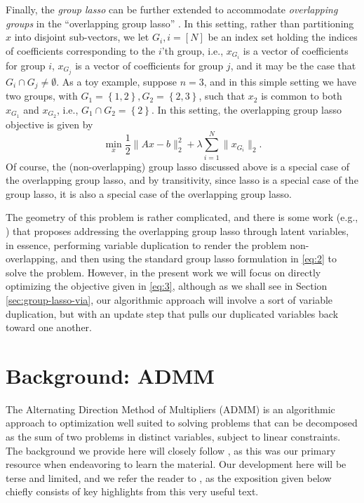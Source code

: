 \documentclass{article}
\begin{document}
Finally, the \emph{group lasso} can be further extended to accommodate \emph{overlapping groups} in the ``overlapping group lasso'' \cite{zhao_composite_2009,mairal_network_2010}.
In this setting, rather than partitioning $x$ into disjoint sub-vectors, we let $G_i, i = [N]$ be an index set holding the indices of coefficients corresponding to the $i$'th group, i.e., $x_{G_i}$ is a vector of coefficients for group $i$, $x_{G_j}$ is a vector of coefficients for group $j$, and it may be the case that $G_i \cap G_j \neq \emptyset$.
As a toy example, suppose $n=3$, and in this simple setting we have two groups, with $G_1 = \left\{ 1, 2 \right\}, G_2 = \left\{ 2, 3 \right\}$, such that $x_2$ is common to both $x_{G_1}$ and $x_{G_2}$, i.e., $G_1 \cap G_2 = \left\{ 2 \right\}$.
In this setting, the overlapping group lasso objective is given by
\begin{equation}
  \label{eq:3}
  \operatorname*{min}_x \frac{1}{2} \lVert Ax - b \rVert_2^2 + \lambda \sum_{i=1}^N \lVert x_{G_i} \rVert_2.
\end{equation}
Of course, the (non-overlapping) group lasso discussed above is a special case of the overlapping group lasso, and by transitivity, since lasso is a special case of the group lasso, it is also a special case of the overlapping group lasso.

The geometry of this problem is rather complicated, and there is some work (e.g., \cite{jacob_group_2009}) that proposes addressing the overlapping group lasso through latent variables, in essence, performing variable duplication to render the problem non-overlapping, and then using the standard group lasso formulation in \eqref{eq:2} to solve the problem.
However, in the present work we will focus on directly optimizing the objective given in \eqref{eq:3}, although as we shall see in Section \ref{sec:group-lasso-via}, our algorithmic approach will involve a sort of variable duplication, but with an update step that pulls our duplicated variables back toward one another.

\section{Background: ADMM}
\label{sec:background:-admm}
The Alternating Direction Method of Multipliers (ADMM) is an algorithmic approach to optimization well suited to solving problems that can be decomposed as the sum of two problems in distinct variables, subject to linear constraints.
The background we provide here will closely follow \cite{boyd_distributed_2011}, as this was our primary resource when endeavoring to learn the material.
Our development here will be terse and limited, and we refer the reader to \cite{boyd_distributed_2011}, as the exposition given below chiefly consists of key highlights from this very useful text.
\end{document}
